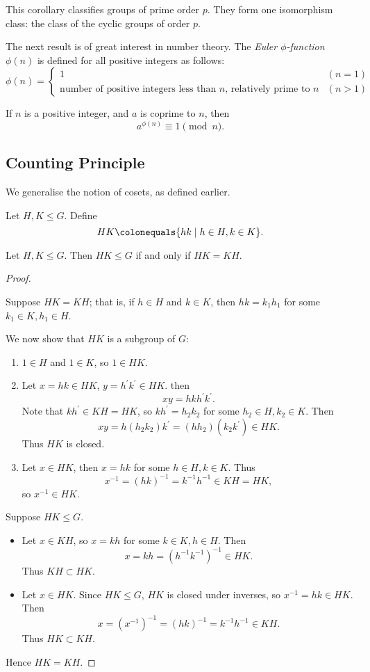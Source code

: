 This corollary classifies groups of prime order $p$. They form one isomorphism class: the class of the cyclic groups of order $p$.

The next result is of great interest in number theory. The \emph{Euler $\phi$-function} $\phi(n)$ is defined for all positive integers as follows:
\[\phi(n)=\begin{cases}
1&(n=1)\\
\text{number of positive integers less than $n$, relatively prime to $n$}&(n>1)
\end{cases}\]

\begin{theorem}[Euler]
If $n$ is a positive integer, and $a$ is coprime to $n$, then
\[a^{\phi(n)}\equiv1\pmod n.\]
\end{theorem}

\subsection{Counting Principle}
We generalise the notion of cosets, as defined earlier.

\begin{definition}
Let $H,K\le G$. Define
\[HK\colonequals\{hk\mid h\in H,k\in K\}.\]
\end{definition}

\begin{lemma}
Let $H,K\le G$. Then $HK\le G$ if and only if $HK=KH$.
\end{lemma}

\begin{proof} \

\fbox{$\impliedby$} Suppose $HK=KH$; that is, if $h\in H$ and $k\in K$, then $hk=k_1h_1$ for some $k_1\in K,h_1\in H$.

We now show that $HK$ is a subgroup of $G$:
\begin{enumerate}[label=(\roman*)]
\item $1\in H$ and $1\in K$, so $1\in HK$.
\item Let $x=hk\in HK$, $y=h^\prime k^\prime\in HK$. then
\[xy=hkh^\prime k^\prime.\]
Note that $kh^\prime\in KH=HK$, so $kh^\prime=h_2k_2$ for some $h_2\in H,k_2\in K$. Then
\[xy=h(h_2k_2)k^\prime=(hh_2) (k_2k^\prime)\in HK.\]
Thus $HK$ is closed.
\item Let $x\in HK$, then $x=hk$ for some $h\in H,k\in K$. Thus
\[x^{-1}=(hk)^{-1}=k^{-1}h^{-1}\in KH=HK,\]
so $x^{-1}\in HK$.
\end{enumerate}

\fbox{$\implies$} Suppose $HK\le G$. 
\begin{itemize}
\item Let $x\in KH$, so $x=kh$ for some $k\in K,h\in H$. Then
\[x=kh=(h^{-1}k^{-1})^{-1}\in HK.\]
Thus $KH\subset HK$.
\item Let $x\in HK$. Since $HK\le G$, $HK$ is closed under inverses, so $x^{-1}=hk\in HK$. Then
\[x=(x^{-1})^{-1}=(hk)^{-1}=k^{-1}h^{-1}\in KH.\]
Thus $HK\subset KH$.
\end{itemize}
Hence $HK=KH$.
\end{proof}

